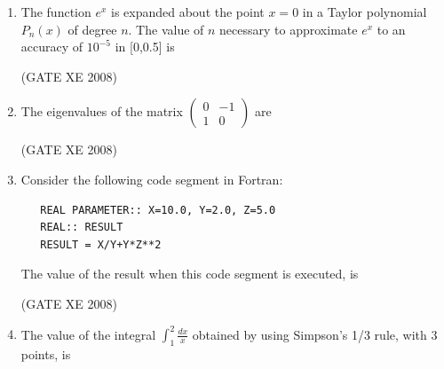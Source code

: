 \documentclass[12pt]{article}
\begin{document}
\begin{enumerate}
(GATE XE 2008)
\item The function $e^x$ is expanded about the point $x=0$ in a Taylor polynomial $P_{n}(x)$ of degree $n$. The value of $n$ necessary to approximate $e^x$ to an accuracy of $10^{-5}$ in [0,0.5] is

\begin{enumerate}
\end{enumerate}

(GATE XE 2008)
\item The eigenvalues of the matrix $\begin{pmatrix}0&-1\\1&0\end{pmatrix}$ are\newline

\begin{enumerate}
\end{enumerate}

(GATE XE 2008)
\item  Consider the following code segment in Fortran:
\begin{verbatim}
   REAL PARAMETER:: X=10.0, Y=2.0, Z=5.0
   REAL:: RESULT
   RESULT = X/Y+Y*Z**2
\end{verbatim}
The value of the result when this code segment is executed, is

\begin{enumerate}
\end{enumerate}

(GATE XE 2008)
\item The value of the integral $\int_{1}^{2} \frac{dx}{x}$ obtained by using Simpson's 1/3 rule, with 3 points, is


\end{enumerate}
\end{document}
